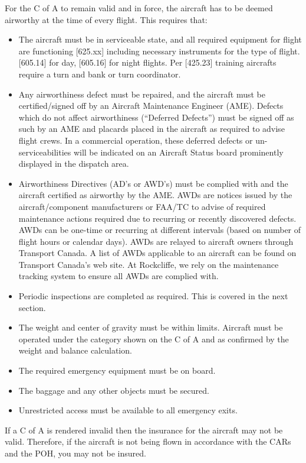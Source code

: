 \documentclass[12pt,letterpaper]{article}
\begin{document}
    For the C of A to remain valid and in force, the aircraft has to be deemed airworthy at the time of every flight.  This requires that:

    \begin{itemize}
        \item The aircraft must be in serviceable state, and all required equipment for flight are functioning [625.xx] including necessary instruments for the type of flight. [605.14] for day, [605.16] for night flights. Per [425.23] training aircrafts require a turn and bank or turn coordinator.
        \item Any airworthiness defect must be repaired, and the aircraft must be certified/signed off by an Aircraft Maintenance Engineer (AME). Defects which do not affect airworthiness (“Deferred Defects”) must be signed off as such by an AME and placards placed in the aircraft as required to advise flight crews. In a commercial operation, these deferred defects or un-serviceabilities will be indicated on an Aircraft Status board prominently displayed in the dispatch area.
        \item Airworthiness Directives (AD's or AWD's) must be complied with and the aircraft certified as airworthy by the AME. AWDs are notices issued by the aircraft/component manufacturers or FAA/TC to advise of required maintenance actions required due to recurring or recently discovered defects. AWDs can be one-time or recurring at different intervals (based on number of flight hours or calendar days). AWDs are relayed to aircraft owners through Transport Canada. A list of AWDs applicable to an aircraft can be found on Transport Canada’s web site. At Rockcliffe, we rely on the maintenance tracking system to ensure all AWDs are complied with. 
        \item Periodic inspections are completed as required. This is covered in the next section.
        \item The weight and center of gravity must be within limits. Aircraft must be operated under the category shown on the C of A and as confirmed by the weight and balance calculation.
        \item The required emergency equipment must be on board. 
        \item The baggage and any other objects must be secured.
        \item Unrestricted access must be available to all emergency exits.
    \end{itemize}

    If a C of A is rendered invalid then the insurance for the aircraft may not be valid. Therefore, if the aircraft is not being flown in accordance with the CARs and the POH, you may not be insured.
\end{document}
